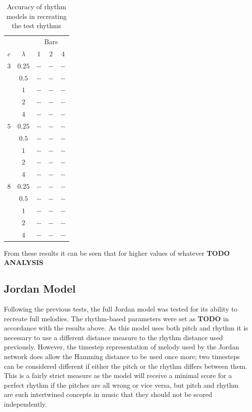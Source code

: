 \documentclass[ author={Stephen Livermore-Tozer},
				supervisor={Dr. Peter Flach},
				degree={MEng},
				title={Algorithmic Co-composition Using Machine Learning},
				subtitle={},
				type={research},
				year={2016} ]{dissertation}
\begin{document}
	\begin{table}[htp]
		\begin{center}
			\begin{tabular}{ccccc}
				\toprule
				& & \multicolumn{3}{c}{Bars}\\
				\cline{3-5}
				$c$ & $\lambda$ & $1$ & $2$ & $4$\\
				\hline
				$3$ & $0.25$ & $-$ & $-$ & $-$\\
				& $0.5$      & $-$ & $-$ & $-$\\
				& $1$        & $-$ & $-$ & $-$\\
				& $2$        & $-$ & $-$ & $-$\\
				& $4$        & $-$ & $-$ & $-$\\
				$5$ & $0.25$ & $-$ & $-$ & $-$\\
				& $0.5$      & $-$ & $-$ & $-$\\
				& $1$        & $-$ & $-$ & $-$\\
				& $2$        & $-$ & $-$ & $-$\\
				& $4$        & $-$ & $-$ & $-$\\
				$8$ & $0.25$ & $-$ & $-$ & $-$\\
				& $0.5$      & $-$ & $-$ & $-$\\
				& $1$        & $-$ & $-$ & $-$\\
				& $2$        & $-$ & $-$ & $-$\\
				& $4$        & $-$ & $-$ & $-$\\
				\bottomrule
			\end{tabular}
		\end{center}
		\caption{Accuracy of rhythm models in recreating the test rhythms}
		\label{tab:rhythm-model-results}
	\end{table}
	
	From these results it can be seen that for higher values of whatever \textbf{TODO ANALYSIS}
	
	\subsection{Jordan Model}
	\label{sec:objective-jordan}
	
	Following the previous tests, the full Jordan model was tested for its ability to recreate full melodies. The rhythm-based parameters were set as \textbf{TODO} in accordance with the results above. As this model uses both pitch and rhythm it is necessary to use a different distance measure to the rhythm distance used previously. However, the timestep representation of melody used by the Jordan network does allow the Hamming distance to be used once more; two timesteps can be considered different if either the pitch or the rhythm differs between them. This is a fairly strict measure as the model will receive a minimal score for a perfect rhythm if the pitches are all wrong or vice versa, but pitch and rhythm are such intertwined concepts in music that they should not be scored independently.
	
\end{document}
